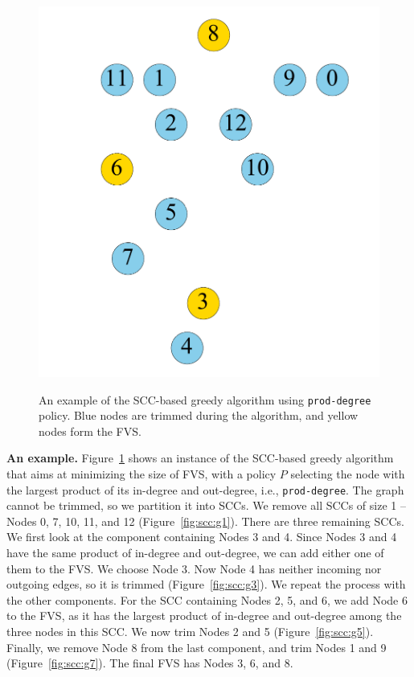 \begin{figure}[t]
\begin{minipage}[b]{0.19\linewidth}
	\end{minipage}                  
	\begin{minipage}[b]{0.19\linewidth}
		\centering
		{\includegraphics[width=\textwidth]{./alg_fig/scc-g7}}
	\end{minipage}  
	\caption{An example of the SCC-based greedy algorithm using \texttt{prod-degree} policy. Blue nodes are trimmed during the algorithm, and yellow nodes form the FVS.}
	\label{fig:scc}
\end{figure}

{\bf An example.} Figure~\ref{fig:scc} shows an instance of the SCC-based greedy algorithm that aims at minimizing the size of FVS, with a policy $P$ selecting the node with the largest product of its in-degree and out-degree, i.e., \texttt{prod-degree}. The graph cannot be trimmed, so we partition it into SCCs. We remove all SCCs of size 1 --  Nodes 0, 7, 10, 11, and 12 (Figure~\ref{fig:scc:g1}). There are three remaining SCCs. We first look at the component containing Nodes 3 and 4. Since Nodes 3 and 4 have the same product of in-degree and out-degree, we can add either one of them to the FVS. We choose Node 3. Now Node 4 has neither incoming nor outgoing edges, so it is trimmed (Figure~\ref{fig:scc:g3}). We repeat the process with the other components. For the SCC containing Nodes 2, 5, and 6, we add Node 6 to the FVS, as it has the largest product of in-degree and out-degree among the three nodes in this SCC. We now trim Nodes 2 and 5 (Figure~\ref{fig:scc:g5}). Finally, we remove Node 8 from the last component, and trim Nodes 1 and 9 (Figure~\ref{fig:scc:g7}). The final FVS has Nodes 3, 6, and 8.

